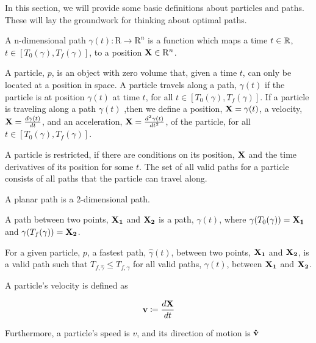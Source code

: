 In this section, we will provide some basic definitions about particles and paths. These will lay the groundwork for thinking about optimal paths.

\begin{definition}
  A n-dimensional path $\gamma(t): \mathrm{R} \to \mathrm{R}^n$ is a function which maps a time $t \in \mathbb R$, $t \in [T_0(\gamma), T_f(\gamma)]$, to a position $\mathbf{X} \in \mathrm{R}^n$. 
\end{definition}

\begin{definition}
  A particle, $p$, is an object with zero volume that, given a time $t$, can only be located at a position in space. A particle travels along a path, $\gamma(t)$ if the particle is at position $\gamma(t)$ at time $t$, for all $t \in [T_0 (\gamma), T_f(\gamma)]$. If a particle is traveling along a path $\gamma(t)$ ,then we define a position, $\mathbf{X} = \gamma(t)$, a velocity, $\mathbf{X} = \frac{d\gamma(t)}{dt}$, and an acceleration, $\mathbf{X} = \frac{d^2\gamma(t)}{dt^2}$, of the particle, for all $t \in [T_0 (\gamma), T_f(\gamma)]$.

  A particle is restricted, if there are conditions on its position, $\mathbf{X}$ and the time derivatives of its position for some $t$. The set of all valid paths for a particle consists of all paths that the particle can travel along.
\end{definition}

\begin{definition}
  A planar path is a 2-dimensional path.
\end{definition}

\begin{definition}
  A path between two points, $\mathbf{X_1}$ and $\mathbf{X_2}$ is a path, $\gamma(t)$, where $\gamma(T_0(\gamma)) = \mathbf{X_1}$ and $\gamma(T_f(\gamma)) = \mathbf{X_2}$.
\end{definition}

\begin{definition}
  For a given particle, $p$, a fastest path, $\hat{\gamma}(t)$, between two points, $\mathbf{X_1}$ and $\mathbf{X_2}$, is a valid path such that $T_{f,\hat{\gamma}} \leq T_{f,\gamma}$ for all valid paths, $\gamma(t)$, between $\mathbf{X_1}$ and $\mathbf{X_2}$.
\end{definition}

\begin{definition}
  A particle's velocity is defined as 

  \[\mathbf{v} \coloneqq \frac{d\mathbf{X}}{dt}\]

  Furthermore, a particle's speed is $v$, and its direction of motion is $\mathbf{\hat{v}}$

\end{definition}

